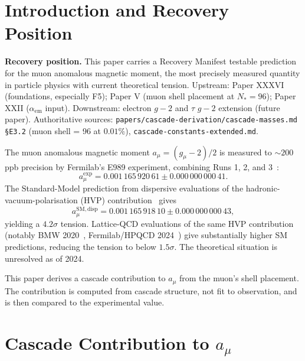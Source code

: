 \documentclass[12pt]{article}
\theoremstyle{remark}
\begin{document}
\section{Introduction and Recovery Position}\label{sec:intro}

\textbf{Recovery position.} This paper carries a Recovery Manifest testable prediction for the muon anomalous magnetic moment, the most precisely measured quantity in particle physics with current theoretical tension. Upstream: Paper XXXVI (foundations, especially F5); Paper V (muon shell placement at $N_* = 96$); Paper XXII ($\alpha_{\mathrm{em}}$ input). Downstream: electron $g-2$ and $\tau$ $g-2$ extension (future paper). Authoritative sources: \texttt{papers/cascade-derivation/cascade-masses.md §E3.2} (muon shell = 96 at $0.01\%$), \texttt{cascade-constants-extended.md}.

The muon anomalous magnetic moment $a_\mu = (g_\mu - 2)/2$ is measured to $\sim 200$ ppb precision by Fermilab's E989 experiment, combining Runs 1, 2, and 3~\citep{Fermilab2023}:
\begin{equation}
a_\mu^{\mathrm{exp}} = 0.001\,165\,920\,61 \pm 0.000\,000\,000\,41.
\end{equation}
The Standard-Model prediction from dispersive evaluations of the hadronic-vacuum-polarisation (HVP) contribution~\citep{TheoryInitiative2020} gives
\begin{equation}
a_\mu^{\mathrm{SM, disp}} = 0.001\,165\,918\,10 \pm 0.000\,000\,000\,43,
\end{equation}
yielding a $4.2\sigma$ tension. Lattice-QCD evaluations of the same HVP contribution (notably BMW 2020~\citep{BMW2021}, Fermilab/HPQCD 2024~\citep{FermilabHPQCD2024}) give substantially higher SM predictions, reducing the tension to below $1.5\sigma$. The theoretical situation is unresolved as of 2024.

This paper derives a cascade contribution to $a_\mu$ from the muon's shell placement. The contribution is computed from cascade structure, not fit to observation, and is then compared to the experimental value.

\section{Cascade Contribution to $a_\mu$}\label{sec:derivation}
\end{document}
